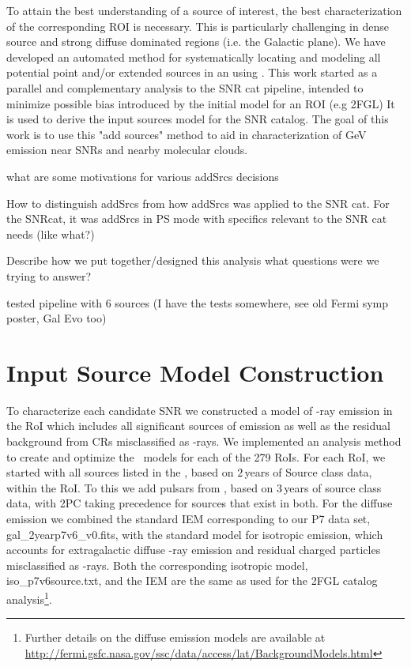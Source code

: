 {To attain the best understanding of a source of interest, the best characterization of the corresponding ROI is necessary. This is particularly challenging in dense source and strong diffuse dominated regions (i.e. the Galactic plane). We have developed an automated method for systematically locating and modeling all potential point and/or extended sources in an \roi{} using \ptlike{}. This work started as a parallel and complementary analysis to the SNR cat pipeline, intended to minimize possible bias introduced by the initial model for an ROI (e.g 2FGL) It is  used to derive the input sources model for the SNR catalog. The goal of this work is to use this "add sources" method to aid in characterization of GeV emission near SNRs and nearby molecular clouds.

what are some motivations for various addSrcs decisions 

How to distinguish addSrcs from how addSrcs was applied to the SNR cat. For the SNRcat, it was addSrcs in PS mode with specifics relevant to the SNR cat needs (like what?)


Describe how we put together/designed this analysis what questions were we trying to answer?


tested pipeline with 6 sources (I have the tests somewhere, see old Fermi symp poster, Gal Evo too)
\section{Input Source Model Construction}\label{snrCat:AddSrcs}



To characterize each candidate SNR we constructed a %
model of \g-ray emission in the RoI which includes all significant sources of emission as well as the residual background from CRs misclassified as \g-rays. We implemented an analysis method to create and optimize the ~models for each of the 279 RoIs. For each RoI, we started with all sources listed in 
the \twofgl \citep{2FGL}, based on $2$\,years of Source class data, within the RoI. To this we add pulsars from \twopc \citep{2PC}, based on $3$\,years of source class data, with 2PC taking precedence for sources that exist in both. 
For the diffuse emission we combined the standard IEM corresponding to our P7 data set, gal\_2yearp7v6\_v0.fits, with the standard %
model for isotropic emission, which accounts for extragalactic diffuse \g-ray emission and residual charged particles misclassified as \g-rays. 
Both the corresponding isotropic model, iso\_p7v6source.txt, and the IEM are the same as used for the 2FGL catalog analysis\footnote{Further details on the diffuse emission models are available at \url{http://fermi.gsfc.nasa.gov/ssc/data/access/lat/BackgroundModels.html}}.

}
